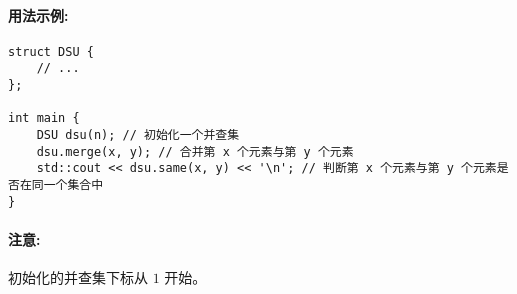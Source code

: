 
\paragraph{用法示例:}
\begin{verbatim}
struct DSU {
    // ...
};

int main {
    DSU dsu(n); // 初始化一个并查集
    dsu.merge(x, y); // 合并第 x 个元素与第 y 个元素
    std::cout << dsu.same(x, y) << '\n'; // 判断第 x 个元素与第 y 个元素是否在同一个集合中
}
\end{verbatim}

\paragraph{注意:}
初始化的并查集下标从 $1$ 开始。